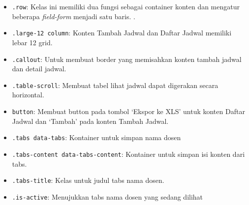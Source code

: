 \begin{itemize}
	\item \texttt{.row}: Kelas ini memiliki dua fungsi sebagai container konten dan mengatur beberapa \textit{field-form} menjadi satu baris. .
	\item \texttt{.large-12 column}: Konten Tambah Jadwal dan Daftar Jadwal memiliki lebar 12 grid.
	\item \texttt{.callout}: Untuk membuat border yang memisahkan konten tambah jadwal dan detail jadwal.
	\item \texttt{.table-scroll}: Membuat tabel lihat jadwal dapat digerakan secara horizontal.
	\item \texttt{button}: Membuat button pada tombol `Ekspor ke XLS' untuk konten Daftar Jadwal dan `Tambah' pada konten Tambah Jadwal.	
	\item \texttt{.tabs data-tabs}: Kontainer untuk simpan nama dosen
	\item \texttt{.tabs-content data-tabs-content}: Kontainer untuk simpan isi konten dari tabs.
	\item \texttt{.tabs-title}: Kelas untuk judul tabs nama dosen.
	\item \texttt{.is-active}: Menujukkan tabs nama dosen yang sedang dilihat
\end{itemize}








